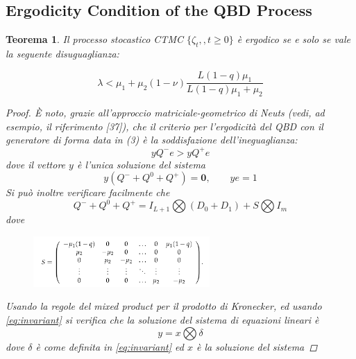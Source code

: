 \documentclass[11pt]{article}
\newtheorem{teorema}{Teorema}[section]
\begin{document}
\subsection{Ergodicity Condition of the QBD Process}


\begin{teorema}
    Il processo stocastico CTMC $\{\zeta_t,,t\geq 0\}$ è ergodico se e solo se vale la seguente disuguaglianza:

    \begin{equation}\label{eq:ergodicity}
        \lambda < \mu_1 + \mu_2(1 - \nu) \frac{L(1-q)\mu_1}{L(1-q)\mu_1 + \mu_2}
    \end{equation}

    \begin{proof}
        È noto, grazie all'approccio matriciale-geometrico di Neuts (vedi, ad esempio, il riferimento [37]), che il criterio per l'ergodicità del QBD con il generatore di forma data in (3) è la soddisfazione dell'ineguaglianza:
        \begin{equation}\label{eq:ergodicity}
            y Q^- e > y Q^+e
        \end{equation}
        dove il vettore $y$ è l'unica soluzione del sistema
        \begin{equation}
            y(Q^- + Q^0 + Q^+) = \textbf{0}, \qquad ye = 1
        \end{equation}
        Si può inoltre verificare facilmente che
        \begin{equation}\label{eq:bigotimes}
            Q^- + Q^0 + Q^+ = I_{L+1} \bigotimes (D_0 + D_1) + S \bigotimes I_{m}
        \end{equation}
        dove
        \begin{figure}[h!]
            \centering
            \includegraphics[width=0.6\textwidth]{lLnSEzP.png}
        \end{figure}
        Usando la regole del mixed product per il prodotto di Kronecker, ed usando \ref{eq:invariant} si verifica che la soluzione del sistema di equazioni lineari è
        \begin{equation}
            y = x \bigotimes \delta
        \end{equation}
        dove $\delta$ è come definita in \ref{eq:invariant} ed $x$ è la soluzione del sistema

\end{proof}
\end{teorema}
\end{document}

